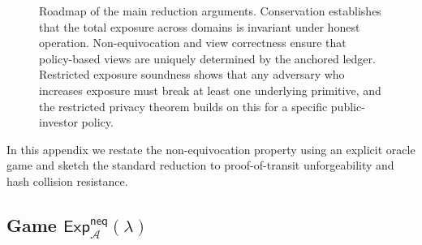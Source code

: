 \documentclass[11pt]{article}
\begin{document}
\begin{figure}[t]
  \centering
  \caption{Roadmap of the main reduction arguments.
  Conservation establishes that the total exposure across domains is invariant under honest operation.
  Non-equivocation and view correctness ensure that policy-based views are uniquely determined by the anchored ledger.
  Restricted exposure soundness shows that any adversary who increases exposure must break at least one underlying primitive,
  and the restricted privacy theorem builds on this for a specific public-investor policy.}
  \label{fig:proofs-roadmap}
\end{figure}
\label{app:neq-reduction}

In this appendix we restate the non-equivocation property using an explicit oracle game and sketch the standard reduction to proof-of-transit unforgeability and hash collision resistance.

\subsection*{Game $\mathsf{Exp}^{\mathsf{neq}}_{\mathcal{A}}(\lambda)$}
\end{document}

